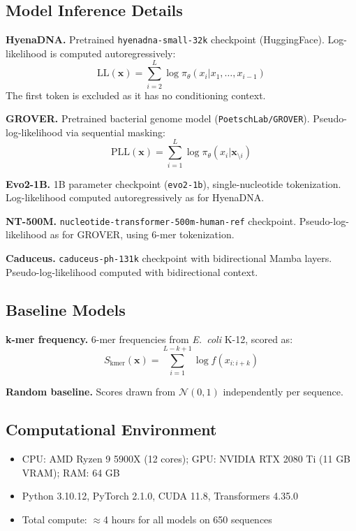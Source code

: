 \documentclass{article}
\newcommand{\LL}{\text{LL}}
\begin{document}
\subsection{Model Inference Details}

\textbf{HyenaDNA.} Pretrained \texttt{hyenadna-small-32k} checkpoint (HuggingFace).
Log-likelihood is computed autoregressively:
\begin{equation}
\LL(\mathbf{x}) = \sum_{i=2}^{L} \log \pi_\theta(x_i | x_1, \ldots, x_{i-1})
\end{equation}
The first token is excluded as it has no conditioning context.

\textbf{GROVER.} Pretrained bacterial genome model (\texttt{PoetschLab/GROVER}).
Pseudo-log-likelihood via sequential masking:
\begin{equation}
\text{PLL}(\mathbf{x}) = \sum_{i=1}^{L} \log \pi_\theta(x_i | \mathbf{x}_{\setminus i})
\end{equation}

\textbf{Evo2-1B.} 1B parameter checkpoint (\texttt{evo2-1b}), single-nucleotide tokenization.
Log-likelihood computed autoregressively as for HyenaDNA.

\textbf{NT-500M.} \texttt{nucleotide-transformer-500m-human-ref} checkpoint.
Pseudo-log-likelihood as for GROVER, using 6-mer tokenization.

\textbf{Caduceus.} \texttt{caduceus-ph-131k} checkpoint with bidirectional Mamba layers.
Pseudo-log-likelihood computed with bidirectional context.

\subsection{Baseline Models}

\textbf{k-mer frequency.} 6-mer frequencies from \textit{E.\ coli} K-12, scored as:
\begin{equation}
S_{\text{kmer}}(\mathbf{x}) = \sum_{i=1}^{L-k+1} \log f(x_{i:i+k})
\end{equation}

\textbf{Random baseline.} Scores drawn from $\mathcal{N}(0, 1)$ independently per sequence.

\subsection{Computational Environment}

\begin{itemize}
\item CPU: AMD Ryzen 9 5900X (12 cores); GPU: NVIDIA RTX 2080 Ti (11 GB VRAM); RAM: 64 GB
\item Python 3.10.12, PyTorch 2.1.0, CUDA 11.8, Transformers 4.35.0
\item Total compute: $\approx$4 hours for all models on 650 sequences
\end{itemize}
\end{document}
